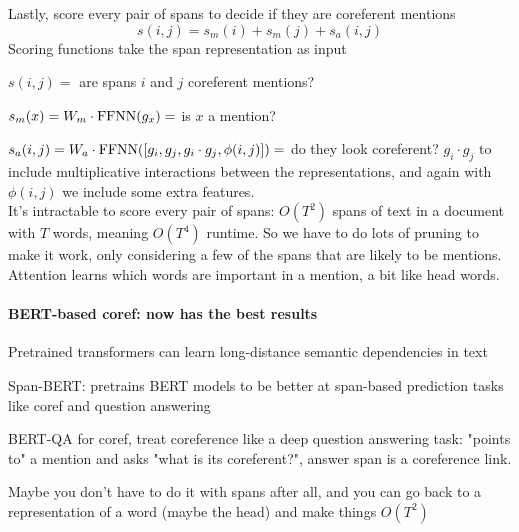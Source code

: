 \documentclass[10pt]{report}
\begin{document}
Lastly, score every pair of spans to decide if they are coreferent mentions
$$s(i,j) = s_m(i) + s_m(j) + s_a(i,j)$$
Scoring functions take the span representation as input
\begin{list}{}{}
	\item $s(i,j)=$ are spans $i$ and $j$ coreferent mentions?
	\item $s_m(x)= W_m\cdot\hbox{FFNN}(g_x)=$ is $x$ a mention?
	\item $s_a(i,j)= W_a\cdot\hbox{FFNN}([g_i,g_j,g_i\cdot g_j, \phi(i,j)])=$ do they look coreferent? $g_i\cdot g_j$ to include multiplicative interactions between the representations, and again with $\phi(i,j)$ we include some extra features.\\
It's intractable to score every pair of spans: $O(T^2)$ spans of text in a document with $T$ words, meaning $O(T^4)$ runtime. So we have to do lots of pruning to make it work, only considering a few of the spans that are likely to be mentions. Attention learns which words are important in a mention, a bit like head words.
\end{list}
\paragraph{BERT-based coref: now has the best results} Pretrained transformers can learn long-distance semantic dependencies in text
\begin{list}{}{}
	\item Span-BERT: pretrains BERT models to be better at span-based prediction tasks like coref and question answering
	\item BERT-QA for coref, treat coreference like a deep question answering task: "points to" a mention and asks "what is its coreferent?", answer span is a coreference link.
	\item Maybe you don't have to do it with spans after all, and you can go back to a representation of a word (maybe the head) and make things $O(T^2)$
\end{list}
\end{document}

